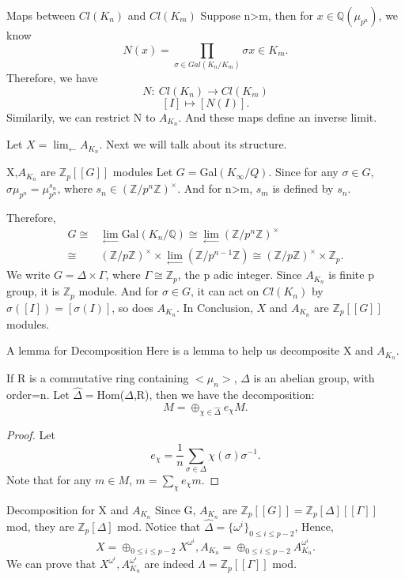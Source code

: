 \documentclass{beamer}
\theoremstyle{plain}
\theoremstyle{definition}
\theoremstyle{remark}
\newcommand{\Q}{\mathbb{Q}}
\newcommand{\Z}{\mathbb{Z}}
\newcommand{\an}{A_{K_n}}
\begin{document}
\begin{frame}{Maps between $Cl(K_n)$ and $Cl(K_m)$}
  Suppose n>m, then for $x \in \Q(\mu_{p^n})$, we know
  \[ N(x) = \prod_{\sigma \in Gal(K_n/K_m)} \sigma x \in K_m.\]
  Therefore, we have
  \[ N: \ Cl(K_n) \rightarrow Cl(K_m) \]
  \[ [I] \mapsto [N(I)].\]
  Similarily, we can restrict N to $\an$. And these maps define an inverse limit.

  Let $X= \lim_{\leftarrow} \an$. Next we will talk about its structure.
\end{frame}

\begin{frame}{X,$\an$ are $\Z_p[[G]]$ modules}
  Let $G=$Gal$(K_{\infty}/Q)$. Since for any $\sigma \in G$, $\sigma \mu_{p^n}=\mu_{p^n}^{s_n}$, where 
  $s_n \in (\Z/p^n\Z)^{\times}$. And for n>m, $s_m$ is defined by $s_n$.

  Therefore, 
  \[ 
    \begin{split}
      G  \cong &\lim_{\leftarrow} \text{Gal}(K_n/\Q)
         \cong \lim_{\leftarrow} (\Z/p^n\Z)^{\times} \\
         \cong &(\Z/p\Z)^{\times} \times \lim_{\leftarrow} (\Z/p^{n-1}\Z) 
         \cong (\Z/p\Z)^{\times} \times \Z_p.
    \end{split}
    \]
  We write $G=\Delta \times \Gamma$, where $\Gamma \cong \Z_p$, the p adic integer.
\vskip 0.2cm
  Since $\an$ is finite p group, it is $\Z_p$ module. And for $\sigma \in G$, it 
  can act on $Cl(K_n)$ by $\sigma ([I])= [\sigma(I)]$, so does $\an$.
 \vskip 0.2cm
  In Conclusion, $X$ and $\an$ are $\Z_p[[G]]$ modules.
\end{frame}

\begin{frame}{A lemma for Decomposition}
  Here is a lemma to help us decomposite X and $\an$.
  \begin{lemma}
    If R is a commutative ring containing $<\mu_n>$, $\Delta$ is an abelian group,
     with order=n. Let $\widehat{\Delta}= $Hom($\Delta$,R), then  we have the decomposition:
     \[ M= \oplus_{\chi \in \widehat{\Delta}} e_{\chi}M.\]
    \end{lemma}
    \begin{proof}
      Let \[ e_{\chi}= \frac{1}{n} \sum_{\sigma \in \Delta} \chi(\sigma)\sigma^{-1}.\]
      Note that for any $m \in M$, $m=\sum_{\chi} e_{\chi}m$.
    \end{proof}
\end{frame}

\begin{frame}{Decomposition for X and $\an$}
  Since G, $\an$ are $\Z_p[[G]]=\Z_p[\Delta][[\Gamma]]$ mod, they are $\Z_p[\Delta]$ mod.
  Notice that $\widehat{\Delta}=\{\omega^i\}_{0 \le i \le p-2}$,
  Hence, 
  \[ X= \oplus_{0 \le i \le p-2} X^{\omega^i}, \an =\oplus_{0 \le i \le p-2} \an^{\omega^i}. \]
  We can prove that $X^{\omega^i},\an^{\omega^i}$ are indeed $\Lambda=\Z_p[[\Gamma]]$ mod.
\end{frame}
\end{document}
